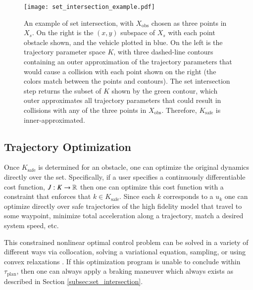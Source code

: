 \begin{figure}
\centering
\texttt{[image: set\_intersection\_example.pdf]}
\caption{An example of set intersection, with $X_\text{obs}$ chosen as three points in $X_s$. On the right is the $(x,y)$ subspace of $X_s$ with each point obstacle shown, and the vehicle plotted in blue. On the left is the trajectory parameter space $K$, with three dashed-line contours containing an outer approximation of the trajectory parameters that would cause a collision with each point shown on the right (the colors match between the points and contours). The set intersection step returns the subset of $K$ shown by the green contour, which outer approximates all trajectory parameters that could result in collisions with any of the three points in $X_\text{obs}$. Therefore, $K_\text{safe}$ is inner-approximated.}
\label{fig:set_int_ex}
\end{figure}

\subsection{Trajectory Optimization}
\label{subsec:traj_opt}
Once $K_\text{safe}$ is determined for an obstacle, one can optimize the original dynamics directly over the set. 
Specifically, if a user specifies a continuously differentiable cost function, $J: K \to \mathbb{R}$ then one can optimize this cost function with a constraint that enforces that $k \in K_{\text{safe}}$.
Since each $k$ corresponds to a $u_k$ one can optimize directly over safe trajectories of the high fidelity model that travel to some waypoint, minimize total acceleration along a trajectory, match a desired system speed, etc.

This constrained nonlinear optimal control problem can be solved in a variety of different ways via collocation, solving a variational equation, sampling, or using convex relaxations \cite{zhao2016control}. 
If this optimization program is unable to conclude within $\tau_{\text{plan}}$, then one can always apply a braking maneuver which always exists as described in Section \ref{subsec:set_intersection}.




